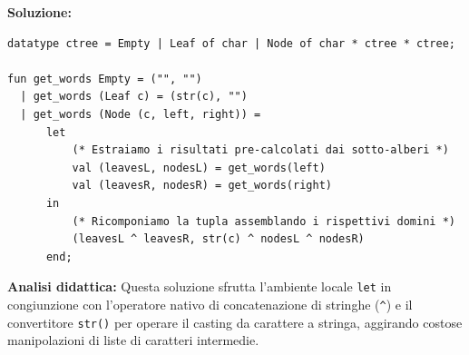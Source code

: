 \documentclass[12pt, a4paper]{article}
\begin{document}
\textbf{Soluzione:}
\begin{verbatim}
datatype ctree = Empty | Leaf of char | Node of char * ctree * ctree;

fun get_words Empty = ("", "")
  | get_words (Leaf c) = (str(c), "")
  | get_words (Node (c, left, right)) =
      let
          (* Estraiamo i risultati pre-calcolati dai sotto-alberi *)
          val (leavesL, nodesL) = get_words(left)
          val (leavesR, nodesR) = get_words(right)
      in
          (* Ricomponiamo la tupla assemblando i rispettivi domini *)
          (leavesL ^ leavesR, str(c) ^ nodesL ^ nodesR)
      end;
\end{verbatim}
\textbf{Analisi didattica:} Questa soluzione sfrutta l'ambiente locale \texttt{let} in congiunzione con l'operatore nativo di concatenazione di stringhe (\texttt{\^}) e il convertitore \texttt{str()} per operare il casting da carattere a stringa, aggirando costose manipolazioni di liste di caratteri intermedie.
\end{document}
